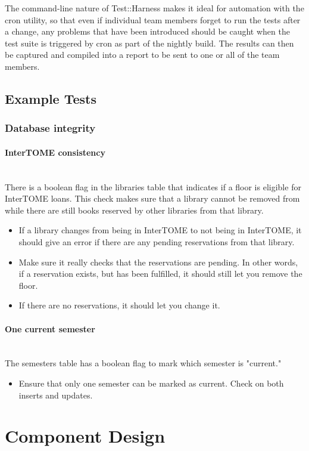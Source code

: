\documentclass[12pt,titlepage]{article}
\begin{document}
The command-line nature of Test::Harness makes it ideal for automation with the cron utility, so that even if individual team members forget to run the tests after a change, any problems that have been introduced should be caught when the test suite is triggered by cron as part of the nightly build.  The results can then be captured and compiled into a report to be sent to one or all of the team members.

\subsection{Example Tests}
\subsubsection{Database integrity}
\paragraph{InterTOME consistency} \\
There is a boolean flag in the libraries table that indicates if a floor is eligible for InterTOME loans. This check makes sure that a library cannot be removed from while there are still books reserved by other libraries from that library.
\begin{itemize}
	\item If a library changes from being in InterTOME to not being in InterTOME, it should give an error if there are any pending reservations from that library.
	\item Make sure it really checks that the reservations are pending. In other words, if a reservation exists, but has been fulfilled, it should still let you remove the floor.
	\item If there are no reservations, it should let you change it.
\end{itemize}

\paragraph{One current semester} \\
The semesters table has a boolean flag to mark which semester is "current."
\begin{itemize}
	\item Ensure that only one semester can be marked as current. Check on both inserts and updates.
\end{itemize}
\section{Component Design}
\end{document}
